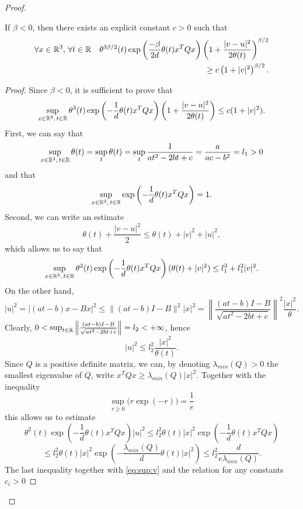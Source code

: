 \begin{proof}
\begin{proposition}\label{pr:lower}
	If $\beta<0$, then there exists an explicit constant $c>0$ such that
	\[\begin{split}
		\forall x\in{\mathbb R^3},\,\forall t\in {\mathbb R}\quad\theta^{3 \beta/2}(t)\exp\left(\frac{-\beta}{2d} \theta(t) x^TQx\right)\left(1+\frac{|v-u|^2}{2 \theta(t)}\right)^{\beta/2}\\\ge c\left(  1+ |v|^2 \right)^{\beta/2}.
	\end{split}\]
\end{proposition}
\begin{proof}
	Since $\beta<0$, it is sufficient to prove that
	\[\sup_{x\in{\mathbb R^3},\, t\in {\mathbb R}}\theta^{3}(t)\exp\left(-\frac{1}{d} \theta(t) x^TQx\right)\left(1+\frac{|v-u|^2}{2 \theta(t)}\right)\le c (1  +|v|^2)   .\]
First, we can say that
\[
	\sup_{x\in{\mathbb R^3},\,t\in {\mathbb R}}\theta(t)=\sup_{t}\theta(t)=\sup_{t}\frac{1}{at^2-2bt+c}=\frac{a}{ac-b^2}=l_1>0
\]
and that
\[
	\sup_{x\in{\mathbb R^3},\,t\in {\mathbb R}}\exp\left(-\frac{1}{d} \theta (t )x^TQx\right)=1.
\]
	Second, we can write an estimate \[
	\theta(t)+\frac{|v-u|^2}{2}\le \theta(t)+|v|^2+|u|^2,
\]
which allows us to say that
\begin{equation}
	\sup_{x\in\mbrt,\,t\in \mbo}\theta^2(t) \exp\left(-\frac{1}{d} \theta(t) x^TQx\right)(\theta(t)+|v|^2)\le l_1^3+l_1^2|v|^2.
%
	\label{eq:sup:v}
\end{equation}
On the other hand, 
\[
	|u|^2 = |(at-b)x-Bx|^2\le \|(at-b)I-B\|^2|x|^2=\left\|\frac{(at-b)I-B}{\sqrt{at^2-2bt+c}}\right\|^2\frac{|x|^2}{\theta}.
\]
Clearly, $0<\sup_{t \in{\mathbb R}}\left\|\frac{(at-b)I-B}{\sqrt{at^2-2bt+c}}\right\|=l_2<+\infty $, hence
\[
	|u|^2\le l_2^2\frac{|x|^2}{\theta(t)}.
\]
Since $Q$ is a positive definite matrix, we can, by denoting $\lambda_{min}(Q)>0$ the smallest eigenvalue of $Q$, write $x^TQx\ge \lambda_{min}(Q)|x|^2$. Together with the inequality \[\sup_{r\ge0}\big(r\exp(-r)\big)=\frac{1}{e}\] this allows us to estimate
\[
	\theta^2(t)\exp\left(-\frac{1}{d} \theta(t) x^TQx\right)|u|^2\le l_2^2\theta(t)|x|^2 \exp\left(-\frac{1}{d} \theta (t)x^TQx\right)
\]
\[
	\le l_2^2\theta(t)|x|^2 \exp\left(-\frac{\lambda_{min}(Q)}{d} \theta (t)|x|^2\right)\le l_2^2\frac{d}{e\lambda_{min}(Q)}.
\]
The last inequality together with \eqref{eq:sup:v} and the relation for any constants $c_i>0$


\end{proof}
\end{proof}
